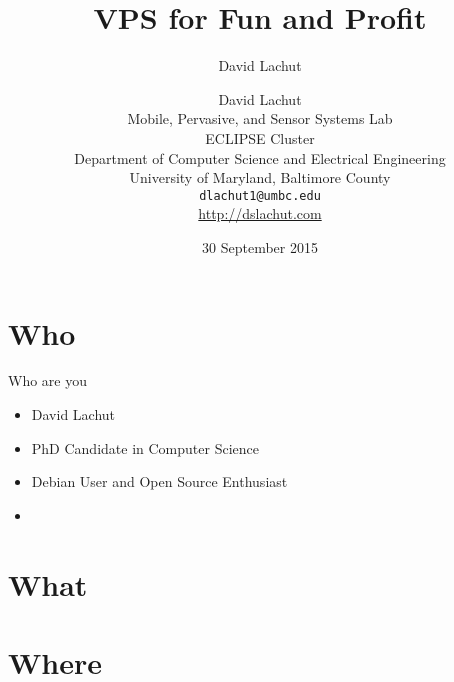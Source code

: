 \documentclass[presentation,aspectratio=169]{beamer}
\author{David Lachut}
\author[David Lachut]{{\large David Lachut}\\
  Mobile, Pervasive, and Sensor Systems Lab\\
  ECLIPSE Cluster\\
  Department of Computer Science and Electrical Engineering\\
  University of Maryland, Baltimore County\\
  {\tt dlachut1@umbc.edu}\\
  \url{http://dslachut.com}
}
\date{30 September 2015}
\title{VPS for Fun and Profit}
\begin{document}
\maketitle

\section{Who}
\label{sec-1}
\begin{frame}[label=sec-1-0-1]{Who are you}
\begin{itemize}
\item David Lachut
\item PhD Candidate in Computer Science
\item Debian User and Open Source Enthusiast
\item 
\end{itemize}
\end{frame}
\section{What}
\label{sec-2}

\section{Where}
\label{sec-3}

\section{}
\label{sec-4}
\end{document}
